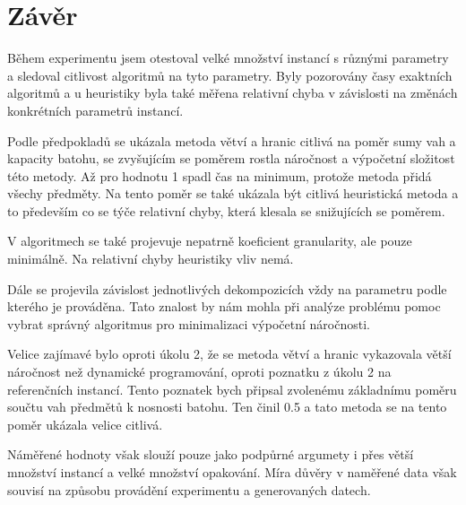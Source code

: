 \documentclass[11pt]{article}
\begin{document}
   




\section{Závěr}
Během experimentu jsem otestoval velké množství instancí s různými parametry a sledoval citlivost algoritmů na tyto parametry. Byly pozorovány časy exaktních algoritmů a u heuristiky byla také měřena relativní chyba v závislosti na změnách konkrétních parametrů instancí. 

Podle předpokladů se ukázala metoda větví a hranic citlivá na poměr sumy vah a kapacity batohu, se zvyšujícím se poměrem rostla náročnost a výpočetní složitost této metody. Až pro hodnotu 1 spadl čas na minimum, protože metoda přidá všechy předměty. Na tento poměr se také ukázala být citlivá heuristická metoda a to především co se týče relativní chyby, která klesala se snižujících se poměrem. 

V algoritmech se také projevuje nepatrně koeficient granularity, ale pouze minimálně. Na relativní chyby heuristiky vliv nemá. 

Dále se projevila závislost jednotlivých dekompozicích vždy na parametru podle kterého je prováděna. Tato znalost by nám mohla při analýze problému pomoc vybrat správný algoritmus pro minimalizaci výpočetní náročnosti. 

Velice zajímavé bylo oproti úkolu 2, že se metoda větví a hranic vykazovala větší náročnost než dynamické programování, oproti poznatku z úkolu 2 na referenčních instancí. Tento poznatek bych připsal zvolenému základnímu poměru součtu vah předmětů k nosnosti batohu. Ten činil 0.5 a tato metoda se na tento poměr ukázala velice citlivá.

Náměřené hodnoty však slouží pouze jako podpůrné argumety i přes větší množství instancí a velké množství opakování. Míra důvěry v naměřené data však souvisí na způsobu provádění experimentu a generovaných datech. 
\end{document}

